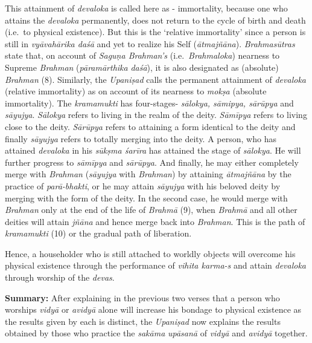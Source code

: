This attainment of \emph{devaloka} is called here as - immortality, because one who attains the \emph{devaloka} permanently, does not return to the cycle of birth and death (i.e.\ to physical existence). But this is the `relative immortality' since a person is still in \emph{vyāvahārika daśā} and yet to realize his Self (\emph{ātmajñāna}). \emph{Brahmasūtras} state that, on account of \emph{Saguṇa Brahman's} (i.e.\ \emph{Brahmaloka}) nearness to Supreme \emph{Brahman} (\emph{pāramārthika} \emph{daśā}), it is also designated as (absolute) \emph{Brahman} (8). Similarly, the \emph{Upaniṣad} calls the permanent attainment of \emph{devaloka} (relative immortality) as  on account of its nearness to \emph{mokṣa} (absolute immortality). The \emph{kramamukti} has four-stages- \emph{sālokya, sāmipya, sārūpya} and \emph{sāyujya}. \emph{Sālokya} refers to living in the realm of the deity. \emph{Sāmīpya} refers to living close to the deity. \emph{Sārūpya} refers to attaining a form identical to the deity and finally \emph{sāyujya} refers to totally merging into the deity. A person, who has attained \emph{devaloka} in his \emph{sūkṣma śarīra} has attained the stage of \emph{sālokya}. He will further progress to \emph{sāmīpya} and \emph{sārūpya}. And finally, he may either completely merge with \emph{Brahman} (\emph{sāyujya} with \emph{Brahman}) by attaining \emph{ātmajñāna} by the practice of \emph{parā-bhakti}, or he may attain \emph{sāyujya} with his beloved deity by merging with the form of the deity. In the second case, he would merge with \emph{Brahman} only at the end of the life of \emph{Brahmā} (9), when \emph{Brahmā} and all other deities will attain \emph{jñāna} and hence merge back into \emph{Brahman}. This is the path of \emph{kramamukti} (10) or the gradual path of liberation.

Hence, a householder who is still attached to worldly objects will overcome his physical existence through the performance of \emph{vihita karma-s} and attain \emph{devaloka} through worship of the \emph{devas}.

\textbf{Summary:} After explaining in the previous two verses that a person who worships \emph{vidyā} or \emph{avidyā} alone will increase his bondage to physical existence as the results given by each is distinct, the \emph{Upaniṣad} now explains the results obtained by those who practice the \emph{sakāma} \emph{upāsanā} of \emph{vidyā} and \emph{avidyā} together.

